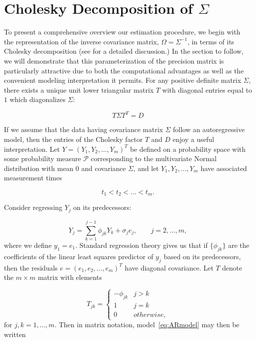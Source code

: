 \documentclass[12pt]{article}
\theoremstyle{definition}
\begin{document}
\section{Cholesky Decomposition of $\Sigma$}

To present a comprehensive overview our estimation procedure, we begin with the representation of the inverse covariance matrix, $\Omega = \Sigma^{-1}$, in terms of its Cholesky decomposition (see \citet{pourahmadi2007cholesky} for a detailed discussion.) In the section to follow, we will demonstrate that this parameterization of the precision matrix is particularly attractive due to both the computational advantages as well as the convenient modeling interpretation it permits. For any positive definite matrix $\Sigma$, there exists a unique unit lower triangular matrix $T$ with diagonal entries equal to $1$ which diagonalizes $\Sigma$:

\begin{equation}
\nonumber T \Sigma T^T = D
\end{equation}
\noindent

If we assume that the data having covariance matrix $\Sigma$ follow an autoregressive model, then the entries of the Cholesky factor $T$ and $D$ enjoy a useful interpretation. Let $Y = \left( Y_{1}, Y_{2}, \dots, Y_{m} \right)^T$ be defined on a probability space with some probability measure $\mathcal{P}$ corresponding to the multivariate Normal distribution with mean $0$ and covariance $\Sigma$, and let $Y_1,Y_2,\dots, Y_m$ have associated measurement times 

\[
t_{1} < t_{2} < \dots< t_{m}.
\]

Consider regressing $Y_{j}$  on its predecessors:

\begin{equation}
{Y}_{j}  = \sum_{k=1}^{j-1} \phi_{jk} Y_{k} + \sigma_{j}e_{j}, \qquad j=2,\dots,m, \label{eq:ARmodel}
\end{equation}
\noindent where we define $y_{1}=e_{1}$. Standard regression theory gives us that if $\lbrace \phi_{jk} \rbrace$ are the coefficients of the linear least squares predictor of $y_{j}$ based on its predecessors, then the residuals $e =\left( e_{1}, e_{2},\dots, e_{m} \right)^T$ have diagonal covariance. Let $T$ denote the $m \times m$  matrix with elements 

\[
T_{jk} = \left\{
\begin{array}{ll}
-\phi_{jk} & j > k\\
1 & j = k \\
0 & otherwise,
\end{array}\right.
\]
\noindent
for $j,k=1,\dots,m$. Then in matrix notation,  model~\ref{eq:ARmodel} may then be written
\end{document}
